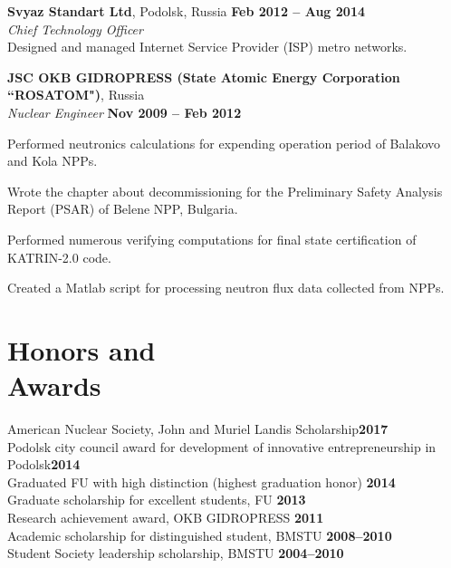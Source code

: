 \documentclass[margin,line]{resume}
\begin{document}
\begin{resume}
    \textbf{Svyaz Standart Ltd}, Podolsk, Russia \hfill \textbf{Feb 2012 -- Aug 2014}\\
		\textsl{Chief Technology Officer}\\
		Designed and managed Internet Service Provider (ISP) metro networks.

    \textbf{JSC OKB GIDROPRESS (State Atomic Energy Corporation ``ROSATOM")}, Russia \\
		\textsl{Nuclear Engineer} \hfill \textbf{Nov 2009 -- Feb 2012}\\
                \vspace{-4mm}\begin{list2}
				\item Performed neutronics calculations for expending operation period of Balakovo and Kola NPPs.
				\item Wrote the chapter about decommissioning for the Preliminary Safety Analysis Report (PSAR) of Belene NPP, Bulgaria.
				\item Performed numerous verifying computations for final state certification of KATRIN-2.0 code.
				\item Created a Matlab script for processing neutron flux data collected from NPPs.
                \end{list2}

    \section{\mysidestyle Honors and\\Awards}
        American Nuclear Society, John and Muriel Landis Scholarship\hfill \textbf{2017}\vspace{.5mm}\\%
		Podolsk city council award for development of innovative entrepreneurship in Podolsk\hfill \textbf{2014}\vspace{.5mm}\\%
		Graduated FU with high distinction (highest graduation honor)                \hfill \textbf{2014}\vspace{.5mm}\\%
		Graduate scholarship for excellent students, FU                              \hfill \textbf{2013}\vspace{.5mm}\\%
		Research achievement award, OKB GIDROPRESS                                   \hfill\textbf{2011}\vspace{.5mm}\\%
		Academic scholarship for distinguished student, BMSTU		                 \hfill\textbf{2008--2010}\vspace{.5mm}\\%
		Student Society leadership scholarship, BMSTU                                \hfill\textbf{2004--2010}%
 

\end{resume}
\end{document}
